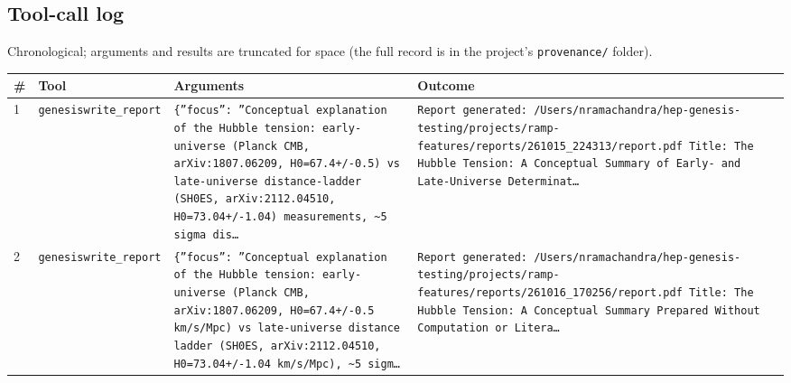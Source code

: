 \documentclass[11pt,a4paper]{article}
\begin{document}
\subsection{Tool-call log}
Chronological; arguments and results are truncated for space (the full record is in the project's \texttt{provenance/} folder).
\begin{longtable}{@{}p{}p{}p{}p{}@{}}
\toprule \# & Tool & Arguments & Outcome \\ \midrule \endhead
1 & \texttt{genesis}\newline\texttt{write\_\allowbreak{}report} & \texttt{\{''focus'':\allowbreak{} ''Conceptual explanation of the Hubble tension:\allowbreak{} early-universe (Planck CMB,\allowbreak{} arXiv:\allowbreak{}1807.06209,\allowbreak{} H0=\allowbreak{}67.4+/\allowbreak{}-0.5)\allowbreak{} vs late-universe distance-ladder (SH0ES,\allowbreak{} arXiv:\allowbreak{}2112.04510,\allowbreak{} H0=\allowbreak{}73.04+/\allowbreak{}-1.04)\allowbreak{} measurements,\allowbreak{} \textasciitilde{}\allowbreak{}5 sigma dis\ldots{}\allowbreak{}} & \texttt{Report generated:\allowbreak{} /\allowbreak{}Users/\allowbreak{}nramachandra/\allowbreak{}hep-genesis-testing/\allowbreak{}projects/\allowbreak{}ramp-features/\allowbreak{}reports/\allowbreak{}261015\_\allowbreak{}224313/\allowbreak{}report.pdf Title:\allowbreak{} The Hubble Tension:\allowbreak{} A Conceptual Summary of Early- and Late-Universe Determinat\ldots{}\allowbreak{}} \\
2 & \texttt{genesis}\newline\texttt{write\_\allowbreak{}report} & \texttt{\{''focus'':\allowbreak{} ''Conceptual explanation of the Hubble tension:\allowbreak{} early-universe (Planck CMB,\allowbreak{} arXiv:\allowbreak{}1807.06209,\allowbreak{} H0=\allowbreak{}67.4+/\allowbreak{}-0.5 km/\allowbreak{}s/\allowbreak{}Mpc)\allowbreak{} vs late-universe distance ladder (SH0ES,\allowbreak{} arXiv:\allowbreak{}2112.04510,\allowbreak{} H0=\allowbreak{}73.04+/\allowbreak{}-1.04 km/\allowbreak{}s/\allowbreak{}Mpc)\allowbreak{},\allowbreak{} \textasciitilde{}\allowbreak{}5 sigm\ldots{}\allowbreak{}} & \texttt{Report generated:\allowbreak{} /\allowbreak{}Users/\allowbreak{}nramachandra/\allowbreak{}hep-genesis-testing/\allowbreak{}projects/\allowbreak{}ramp-features/\allowbreak{}reports/\allowbreak{}261016\_\allowbreak{}170256/\allowbreak{}report.pdf Title:\allowbreak{} The Hubble Tension:\allowbreak{} A Conceptual Summary Prepared Without Computation or Litera\ldots{}\allowbreak{}} \\
\bottomrule\end{longtable}
\end{document}
